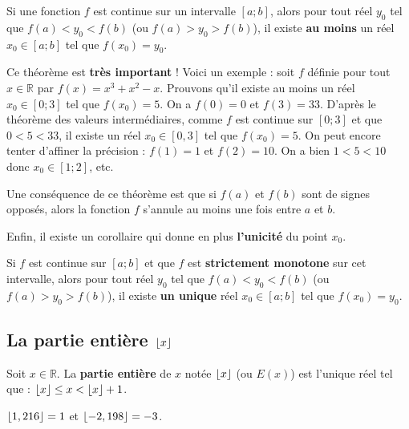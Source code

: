 	\begin{formula}
		Si une fonction $f$ est continue sur un intervalle $[a;b]$, alors pour tout réel $y_0$ tel que $f(a) < y_0 < f(b)$ (ou $f(a) > y_0 > f(b)$), il existe \textbf{au moins} un réel $x_0 \in [a;b]$ tel que $f(x_0) = y_0$.
	\end{formula}

	\begin{tip}[Exemple]
		Ce théorème est \textbf{très important} ! Voici un exemple : soit $f$ définie pour tout $x \in \mathbb{R}$ par $f(x) = x^3+x^2-x$. Prouvons qu'il existe au moins un réel $x_0 \in [0;3]$ tel que $f(x_0) = 5$. On a $f(0) = 0$ et $f(3) = 33$. D'après le théorème des valeurs intermédiaires, comme $f$ est continue sur $[0;3]$ et que $0 < 5 < 33$,
		il existe un réel $x_0 \in [0,3]$ tel que $f(x_0) = 5$.
		\newpar
		On peut encore tenter d'affiner la précision : $f(1) = 1$ et $f(2) = 10$. On a bien $1 < 5 < 10$ donc $x_0 \in [1;2]$, etc.
	\end{tip}

	\begin{tip}
		Une conséquence de ce théorème est que si $f(a)$ et $f(b)$ sont de signes opposés, alors la fonction $f$ s'annule au moins une fois entre $a$ et $b$.
	\end{tip}

	Enfin, il existe un corollaire qui donne en plus \textbf{l'unicité} du point $x_0$.

	\begin{formula}[Corollaire]
		Si $f$ est continue sur $[a;b]$ et que $f$ est \textbf{strictement monotone} sur cet intervalle, alors pour tout réel $y_0$ tel que $f(a) < y_0 < f(b)$ (ou $f(a) > y_0 > f(b)$), il existe \textbf{un unique} réel $x_0 \in [a;b]$ tel que $f(x_0) = y_0$.
	\end{formula}

	\subsection{La partie entière $\lfloor x \rfloor$}

	\begin{formula}[Définition]
		Soit $x \in \mathbb{R}$. La \textbf{partie entière} de $x$ notée $\lfloor x \rfloor$ (ou $E(x)$) est l'unique réel tel que : $\lfloor x \rfloor \leq x < \lfloor x \rfloor + 1$.
	\end{formula}

	\begin{tip}[Exemple]
		$\lfloor 1,216 \rfloor = 1$ et $\lfloor -2,198 \rfloor = -3$.
	\end{tip}

